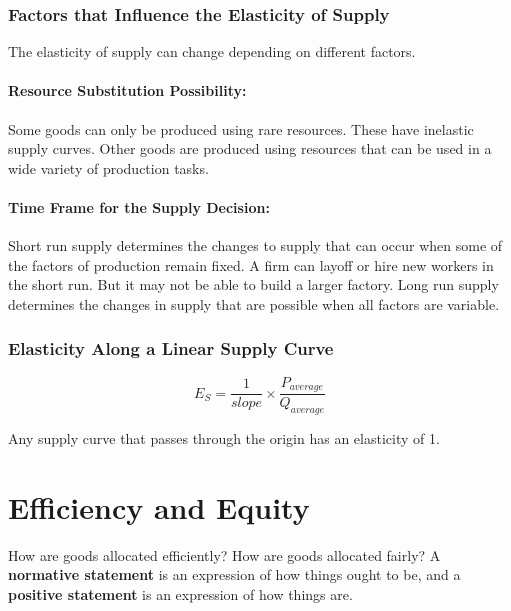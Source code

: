\documentclass[letterpaper, 12pt]{article}
\begin{document}
\subsubsection{Factors that Influence the Elasticity of Supply}
The elasticity of supply can change depending on different factors.

\paragraph{Resource Substitution Possibility:}
Some goods can only be produced using rare resources. These have inelastic
supply curves. Other goods are produced using resources that can be used in
a wide variety of production tasks.

\paragraph{Time Frame for the Supply Decision:}
Short run supply determines the changes to supply that can occur when some of
the factors of production remain fixed. A firm can layoff or hire new workers
in the short run. But it may not be able to build a larger factory. Long run
supply determines the changes in supply that are possible when all factors are
variable.

\subsubsection{Elasticity Along a Linear Supply Curve}
\[ E_{S} = \frac{1}{slope}\times\frac{P_{average}}{Q_{average}} \]
\begin{center}
\end{center}
Any supply curve that passes through the origin has an elasticity of 1.

\section{Efficiency and Equity}
How are goods allocated efficiently? How are goods allocated fairly? A
\textbf{normative statement} is an expression of how things ought to be, and a
\textbf{positive statement} is an expression of how things are.
\end{document}
